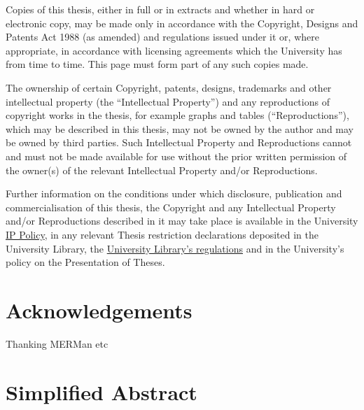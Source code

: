 \documentclass[
  12pt,
  letterpaper,
  DIV=11,
  numbers=noendperiod]{scrreprt}
\begin{document}
Copies of this thesis, either in full or in extracts and whether in hard
or electronic copy, may be made only in accordance with the Copyright,
Designs and Patents Act 1988 (as amended) and regulations issued under
it or, where appropriate, in accordance with licensing agreements which
the University has from time to time. This page must form part of any
such copies made.

The ownership of certain Copyright, patents, designs, trademarks and
other intellectual property (the ``Intellectual Property'') and any
reproductions of copyright works in the thesis, for example graphs and
tables (``Reproductions''), which may be described in this thesis, may
not be owned by the author and may be owned by third parties. Such
Intellectual Property and Reproductions cannot and must not be made
available for use without the prior written permission of the owner(s)
of the relevant Intellectual Property and/or Reproductions.

Further information on the conditions under which disclosure,
publication and commercialisation of this thesis, the Copyright and any
Intellectual Property and/or Reproductions described in it may take
place is available in the University
\href{https://documents.manchester.ac.uk/DocuInfo.aspx?DocID=24420}{IP
Policy}, in any relevant Thesis restriction declarations deposited in
the University Library, the
\href{https://www.library.manchester.ac.uk/about/regulations/}{University
Library's regulations} and in the University's policy on the
Presentation of Theses.


\hypertarget{acknowledgements}{%
\chapter*{Acknowledgements}\label{acknowledgements}}


Thanking MERMan etc


\hypertarget{simplified-abstract}{%
\chapter*{Simplified Abstract}\label{simplified-abstract}}

\end{document}
